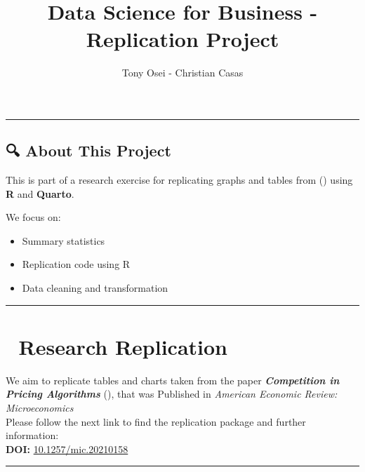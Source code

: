 \documentclass[
  man,
  longtable,
  nolmodern,
  notxfonts,
  notimes,
  colorlinks=true,linkcolor=blue,citecolor=blue,urlcolor=blue]{apa7}
\title{Data Science for Business - Replication Project}
\author{Tony Osei - Christian Casas}
\affiliation{
{Hochschule Fresenius}}
\providecommand{\tightlist}{%
  \setlength{\itemsep}{0pt}\setlength{\parskip}{0pt}}
\begin{document}
\maketitle


\setcounter{secnumdepth}{-\maxdimen} %

\setlength\LTleft{0pt}


\begin{center}\rule{0.5\linewidth}{0.5pt}\end{center}

\subsection{🔍 About This Project}\label{about-this-project}

This is part of a research exercise for replicating graphs and tables
from () using \textbf{R}
and \textbf{Quarto}.

We focus on:

\begin{itemize}
\tightlist
\item
  Summary statistics\\
\item
  Replication code using R\\
\item
  Data cleaning and transformation
\end{itemize}

\begin{center}\rule{0.5\linewidth}{0.5pt}\end{center}

\section{🎯 Research Replication}\label{research-replication}

We aim to replicate tables and charts taken from the paper
\textbf{\emph{Competition in Pricing Algorithms}}
(), that was Published in
\emph{American Economic Review: Microeconomics}\\

Please follow the next link to find the replication package and further
information:\\
\textbf{DOI:}
\href{https://doi.org/10.1257/mic.20210158}{10.1257/mic.20210158}

\begin{center}\rule{0.5\linewidth}{0.5pt}\end{center}
\end{document}
